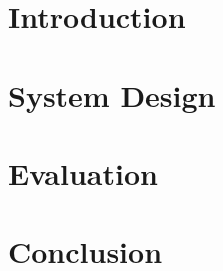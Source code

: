 \documentclass[conference]{IEEEtran}
\begin{document}
\section{Introduction}



\section{System Design}


\section{Evaluation}


\section{Conclusion}

\vspace{-10pt}


\end{document}

